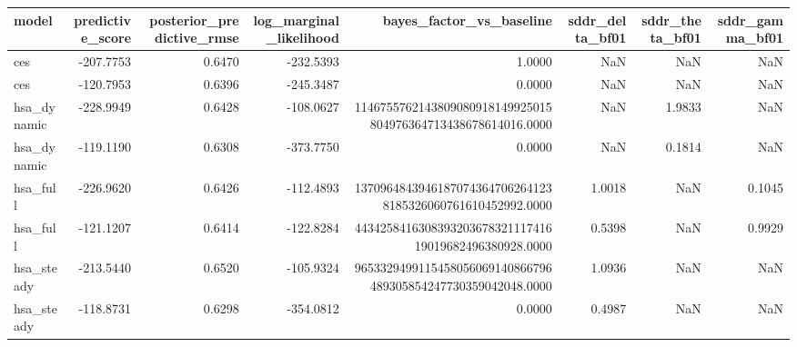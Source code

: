 \begin{tabular}{lrrrrrrr}
\toprule
model & predictive\_score & posterior\_predictive\_rmse & log\_marginal\_likelihood & bayes\_factor\_vs\_baseline & sddr\_delta\_bf01 & sddr\_theta\_bf01 & sddr\_gamma\_bf01 \\
\midrule
ces & -207.7753 & 0.6470 & -232.5393 & 1.0000 & NaN & NaN & NaN \\
ces & -120.7953 & 0.6396 & -245.3487 & 0.0000 & NaN & NaN & NaN \\
hsa\_dynamic & -228.9949 & 0.6428 & -108.0627 & 1146755762143809080918149925015804976364713438678614016.0000 & NaN & 1.9833 & NaN \\
hsa\_dynamic & -119.1190 & 0.6308 & -373.7750 & 0.0000 & NaN & 0.1814 & NaN \\
hsa\_full & -226.9620 & 0.6426 & -112.4893 & 13709648439461870743647062641238185326060761610452992.0000 & 1.0018 & NaN & 0.1045 \\
hsa\_full & -121.1207 & 0.6414 & -122.8284 & 443425841630839320367832111741619019682496380928.0000 & 0.5398 & NaN & 0.9929 \\
hsa\_steady & -213.5440 & 0.6520 & -105.9324 & 9653329499115458056069140866796489305854247730359042048.0000 & 1.0936 & NaN & NaN \\
hsa\_steady & -118.8731 & 0.6298 & -354.0812 & 0.0000 & 0.4987 & NaN & NaN \\
\bottomrule
\end{tabular}
